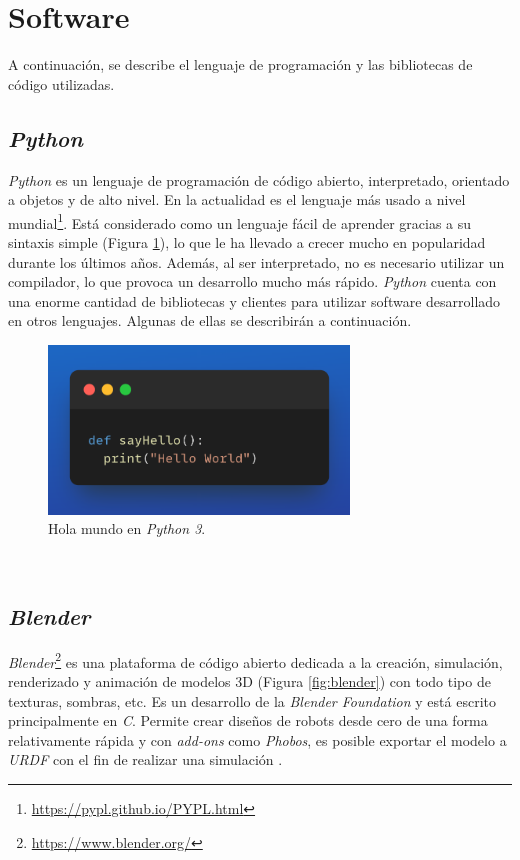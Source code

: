 \section{Software}
A continuación, se describe el lenguaje de programación y las bibliotecas de código utilizadas.

\subsection{\textit{Python}}
\label{subsection:python}
\textit{Python} es un lenguaje de programación de código abierto, interpretado, orientado a objetos y de alto nivel. En la actualidad es el lenguaje más usado a nivel mundial\footnote{\url{https://pypl.github.io/PYPL.html}}. Está considerado como un lenguaje fácil de aprender gracias a su sintaxis simple (Figura \ref{fig:helloworldpython}), lo que le ha llevado a crecer mucho en popularidad durante los últimos años. Además, al ser interpretado, no es necesario utilizar un compilador, lo que provoca un desarrollo mucho más rápido. \textit{Python} cuenta con una enorme cantidad de bibliotecas y clientes para utilizar software desarrollado en otros lenguajes. Algunas de ellas se describirán a continuación.\\

\begin{figure} [h!]
	\begin{center}
		\includegraphics[width=8cm]{figs/helloworldpython}
	\end{center}
	\caption{Hola mundo en \textit{Python 3}.}
	\label{fig:helloworldpython}
\end{figure}\

\subsection{\textit{Blender}}
\label{subsection:blender}
\textit{Blender}\footnote{\url{https://www.blender.org/}} es una plataforma de código abierto dedicada a la creación, simulación, renderizado y animación de modelos 3D (Figura \ref{fig:blender}) con todo tipo de texturas, sombras, etc. Es un desarrollo de la \textit{Blender Foundation} y está escrito principalmente en \textit{C}. Permite crear diseños de robots desde cero de una forma relativamente rápida y con \textit{add-ons} como \textit{Phobos}, es posible exportar el modelo a \textit{URDF} con el fin de realizar una simulación \cite{phobos}.\\


